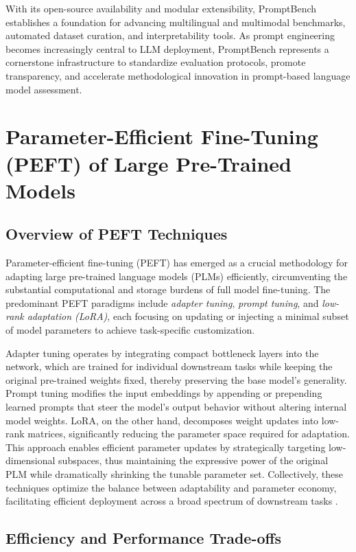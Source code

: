 \documentclass[sigconf]{acmart}
\begin{document}
With its open-source availability and modular extensibility, PromptBench establishes a foundation for advancing multilingual and multimodal benchmarks, automated dataset curation, and interpretability tools. As prompt engineering becomes increasingly central to LLM deployment, PromptBench represents a cornerstone infrastructure to standardize evaluation protocols, promote transparency, and accelerate methodological innovation in prompt-based language model assessment.

\section{Parameter-Efficient Fine-Tuning (PEFT) of Large Pre-Trained Models}

\subsection{Overview of PEFT Techniques}

Parameter-efficient fine-tuning (PEFT) has emerged as a crucial methodology for adapting large pre-trained language models (PLMs) efficiently, circumventing the substantial computational and storage burdens of full model fine-tuning. The predominant PEFT paradigms include \textit{adapter tuning}, \textit{prompt tuning}, and \textit{low-rank adaptation (LoRA)}, each focusing on updating or injecting a minimal subset of model parameters to achieve task-specific customization. 

Adapter tuning operates by integrating compact bottleneck layers into the network, which are trained for individual downstream tasks while keeping the original pre-trained weights fixed, thereby preserving the base model’s generality. Prompt tuning modifies the input embeddings by appending or prepending learned prompts that steer the model’s output behavior without altering internal model weights. LoRA, on the other hand, decomposes weight updates into low-rank matrices, significantly reducing the parameter space required for adaptation. This approach enables efficient parameter updates by strategically targeting low-dimensional subspaces, thus maintaining the expressive power of the original PLM while dramatically shrinking the tunable parameter set. Collectively, these techniques optimize the balance between adaptability and parameter economy, facilitating efficient deployment across a broad spectrum of downstream tasks \cite{ref48}.

\subsection{Efficiency and Performance Trade-offs}
\end{document}
